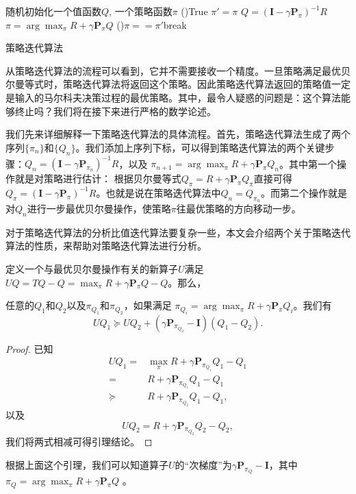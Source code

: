 \begin{algorithm}[htbp]
    \LinesNumbered
    随机初始化一个值函数$Q$, 一个策略函数$\pi$\;
    \While(){True}{
        $\pi' = \pi$\;
        $Q = (\mathbf{I} - \gamma \mathbf{P}_{\pi})^{-1}R$\;
        $\pi = \arg\max_{\pi} R + \gamma \mathbf{P}_{\pi} Q$\;
        \If(){$\pi == \pi'$}{break\;}
    }
    \caption{策略迭代算法}
\end{algorithm}

从策略迭代算法的流程可以看到，它并不需要接收一个精度。一旦策略满足最优贝尔曼等式时，策略迭代算法将返回这个策略。因此策略迭代算法返回的策略值一定是输入的马尔科夫决策过程的最优策略。其中，最令人疑惑的问题是：这个算法能够终止吗？我们将在接下来进行严格的数学论述。

我们先来详细解释一下策略迭代算法的具体流程。首先，策略迭代算法生成了两个序列$\{\pi_n\}$和$\{Q_n\}$。我们添加上序列下标，可以得到策略迭代算法的两个关键步骤：$Q_n = (\mathbf{I} - \gamma \mathbf{P}_{\pi_n})^{-1} R$，以及 $\pi_{n+1} = \arg\max_\pi R + \gamma \mathbf{P}_\pi Q_n$。其中第一个操作就是对策略进行估计： 根据贝尔曼等式$Q_\pi = R + \gamma \mathbf{P}_{\pi} Q_\pi$直接可得$Q_\pi = (\mathbf{I} - \gamma \mathbf{P}_\pi)^{-1} R$。也就是说在策略迭代算法中$Q_n = Q_{\pi_n}$。而第二个操作就是对$Q_n$进行一步最优贝尔曼操作，使策略$\pi$往最优策略的方向移动一步。

对于策略迭代算法的分析比值迭代算法要复杂一些，本文会介绍两个关于策略迭代算法的性质，来帮助对策略迭代算法进行分析。

定义一个与最优贝尔曼操作有关的新算子$U$满足$UQ = TQ - Q = \max_\pi R + \gamma \mathbf{P}_{\pi} Q - Q$。那么，
\begin{lemma}\label{lem:subgradient-u}
    任意的$Q_1$和$Q_2$以及$\pi_{Q_1}$和$\pi_{Q_2}$，如果满足
    $\pi_{Q_i} = \arg\max_{\pi} R + \gamma\mathbf{P}_{\pi} Q_i$。我们有
    \begin{equation}
        UQ_1 \succeq UQ_2 + (\gamma \mathbf{P}_{\pi_{Q_2}} - \mathbf{I})(Q_1 - Q_2).
    \end{equation}
\end{lemma}
\begin{proof}
    已知
    \begin{align*}
        UQ_1 =& \max_{\pi} R + \gamma \mathbf{P}_{\pi_{Q_1}} Q_1 - Q_1\\
        =& R + \gamma \mathbf{P}_{\pi_{Q_1}} Q_1 - Q_1\\
        \succeq& R + \gamma \mathbf{P}_{\pi_{Q_2}} Q_1 - Q_1,
    \end{align*}
    以及
    \begin{equation*}
        UQ_2 = R + \gamma \mathbf{P}_{\pi_{Q_2}} Q_2 - Q_2,
    \end{equation*}
    我们将两式相减可得引理结论。
\end{proof}
根据上面这个引理，我们可以知道算子$U$的``次梯度''为$\gamma \mathbf{P}_{\pi_Q} - \mathbf{I}$，其中$\pi_Q = \arg\max_\pi R + \gamma\mathbf{P}_{\pi} Q$ 。

